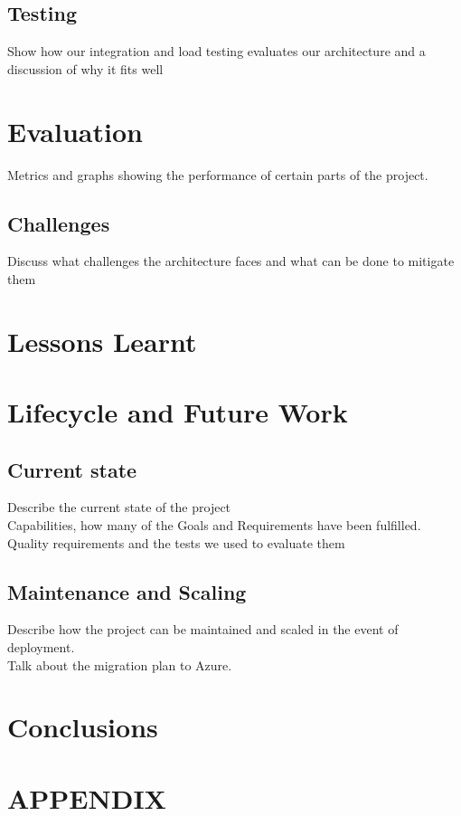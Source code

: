 \documentclass[prodmode,acmtecs]{acmsmall} %
\begin{document}
\subsection{Testing}
Show how our integration and load testing evaluates our architecture and a discussion of why it fits well

\section{Evaluation}
Metrics and graphs showing the performance of certain parts of the project.

\subsection{Challenges}
Discuss what challenges the architecture faces and what can be done to mitigate them

\section{Lessons Learnt}

\section{Lifecycle and Future Work}
\subsection{Current state}
Describe the current state of the project\\
Capabilities, how many of the Goals and Requirements have been fulfilled.\\
Quality requirements and the tests we used to evaluate them\\

\subsection{Maintenance and Scaling}
Describe how the project can be maintained and scaled in the event of deployment.\\
Talk about the migration plan to Azure.\\


\section{Conclusions}


\appendix
\section*{APPENDIX}
\setcounter{section}{1}
\end{document}
